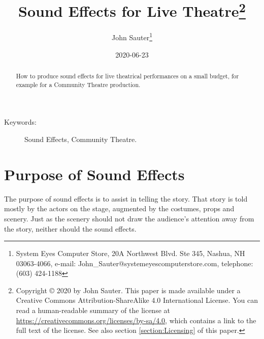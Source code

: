 \documentclass[letterpaper,twoside]{article}
\begin{document}
\title{Sound Effects for Live Theatre\footnote{Copyright
    {\copyright} 2020 by John Sauter.
    This paper is made available under a
    Creative Commons Attribution-ShareAlike 4.0 International License.
    You can read a human-readable summary of the license at
    \url{https://creativecommons.org/licenses/by-sa/4.0}, which contains
    a link to the full text of the license.
    See also section \ref{section:Licensing} of this paper.}
}
\author{John Sauter\footnote{
    System Eyes Computer Store,
    20A Northwest Blvd.  Ste 345,
    Nashua, NH  03063-4066,
    e-mail: John\_Sauter@systemeyescomputerstore.com,
    telephone: (603) 424-1188}}
\date{2020-06-23}
\maketitle
\begin{abstract}
  How to produce sound effects for live theatrical performances
  on a small budget,
  for example for a Community Theatre production.
\end{abstract}
\begin{description}
\item[Keywords:]Sound Effects, Community Theatre.
\end{description}
  
\newpage
\section{Purpose of Sound Effects}
The purpose of sound effects is to assist in telling the story.
That story is told mostly by the actors on the stage, augmented
by the costumes, props and scenery.  Just as the scenery should
not draw the audience's attention away from the story, neither
should the sound effects.
\end{document}
